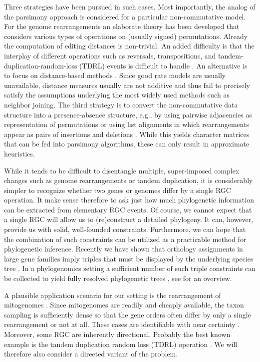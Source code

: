 \documentclass[smallextended]{svjour3}
\let\cite\citep
\begin{document}
Three strategies have been pursued in such cases. Most importantly, the
analog of the parsimony approach is considered for a particular
non-commutative model. For the genome rearrangements an elaborate theory has
been developed that considers various types of operations on (usually
signed) permutations. Already the computation of editing distances is
non-trivial. An added difficulty is that the interplay of different
operations such as reversals, transpositions, and
tandem-duplication-random-loss (TDRL) events is difficult to handle
\cite{Bernt:07a,Hartmann:16}. An alternative is to focus on distance-based
methods \cite{Wang:06}. Since good rate models are usually unavailable,
distance measures usually are not additive and thus fail to precisely
satisfy the assumptions underlying the most widely used methods such as
neighbor joining. The third strategy is to convert the non-commutative data
structure into a presence-absence structure, e.g., by using pairwise
adjacencies \cite{Tang:05} as representation of permutations or using list
alignments in which rearrangements appear as pairs of insertions and
deletions \cite{Fritzsch:06a}. While this yields character matrices that
can be fed into parsimony algorithms, these can only result in approximate
heuristics.

While it tends to be difficult to disentangle multiple, super-imposed
complex changes such as genome rearrangements or tandem duplication, it is
considerably simpler to recognize whether two genes or genomes differ by a
single RGC operation. It make sense therefore to ask just how much
phylogenetic information can be extracted from elementary RGC events. Of
course, we cannot expect that a single RGC will allow us to (re)construct a
detailed phylogeny. It can, however, provide us with solid, well-founded
constraints. Furthermore, we can hope that the combination of such
constraints can be utilized as a practicable method for phylogenetic
inference. Recently we have shown that orthology assignments in large gene
families imply triples that must be displayed by the underlying species
tree \cite{HernandezRosales:12a,Hellmuth:13a}. In a phylogenomics setting a
sufficient number of such triple constraints can be collected to yield
fully resolved phylogenetic trees \cite{Hellmuth:15a}, see \cite{HW:16b}
for an overview.

A plausible application scenario for our setting is the rearrangement of
mitogenomes \cite{Sankoff:82}. Since mitogenomes are readily and cheaply
available, the taxon sampling is sufficiently dense so that the gene orders
often differ by only a single rearrangement or not at all. These cases are
identifiable with near certainty \cite{Bernt:07a}. Moreover, some RGC are
inherently directional. Probably the best known example is the tandem
duplication random loss (TDRL) operation \cite{Chaudhuri:06}. We will
therefore also consider a directed variant of the problem.
\end{document}

